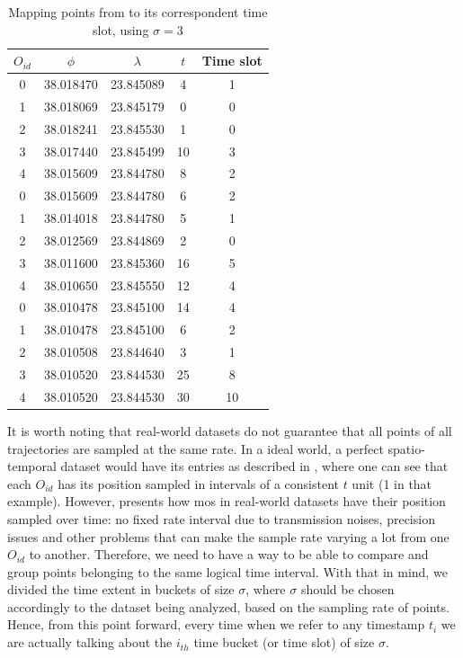 \begin{table}[h!]
    \centering
    \caption{Mapping points from  to its correspondent time slot, using $\sigma = 3$}
    \label{tbl:timeslot}
    \begin{tabular}{c c c c c}
        \toprule
        \textbf{$O_{id}$} & \textbf{$\phi$} & \textbf{$\lambda$} & \textbf{$t$} & \textbf{Time slot} \\
        \toprule
        0 & 38.018470 & 23.845089 & 4 & 1 \\
        1 & 38.018069 & 23.845179 & 0 & 0 \\
        2 & 38.018241 & 23.845530 & 1 & 0 \\
        3 & 38.017440 & 23.845499 & 10 & 3 \\
        4 & 38.015609 & 23.844780 & 8  & 2 \\
        \bottomrule
        0 & 38.015609 & 23.844780 & 6 & 2 \\
        1 & 38.014018 & 23.844780 & 5 & 1 \\
        2 & 38.012569 & 23.844869 & 2 & 0 \\
        3 & 38.011600 & 23.845360 & 16 & 5 \\
        4 & 38.010650 & 23.845550 & 12 & 4 \\
        \bottomrule
        0 & 38.010478 & 23.845100 & 14 & 4 \\
        1 & 38.010478 & 23.845100 & 6 & 2 \\
        2 & 38.010508 & 23.844640 & 3 & 1 \\
        3 & 38.010520 & 23.844530 & 25 & 8 \\
        4 & 38.010520 & 23.844530 & 30 & 10 \\
        \bottomrule
    \end{tabular}
\end{table}

It is worth noting that real-world datasets do not guarantee that all points of all trajectories are sampled at the same
rate. In a ideal world, a perfect spatio-temporal dataset would have its entries as described in
, where one can see that each $O_{id}$ has its position sampled in intervals of a consistent $t$
unit (1 in that example). However,  presents how \acp{mo} in real-world datasets have their
position sampled over time: no fixed rate interval due to transmission noises, precision issues and other problems that
can make the sample rate varying a lot from one $O_{id}$ to another. Therefore, we need to have a way to be able to
compare and group points belonging to the same logical time interval. With that in mind, we divided the time extent in
buckets of size $\sigma$, where $\sigma$ should be chosen accordingly to the dataset being analyzed, based on the
sampling rate of points. Hence, from this point forward, every time when we refer to any timestamp $t_i$ we are actually
talking about the $i_{th}$ time bucket (or time slot) of size $\sigma$.

